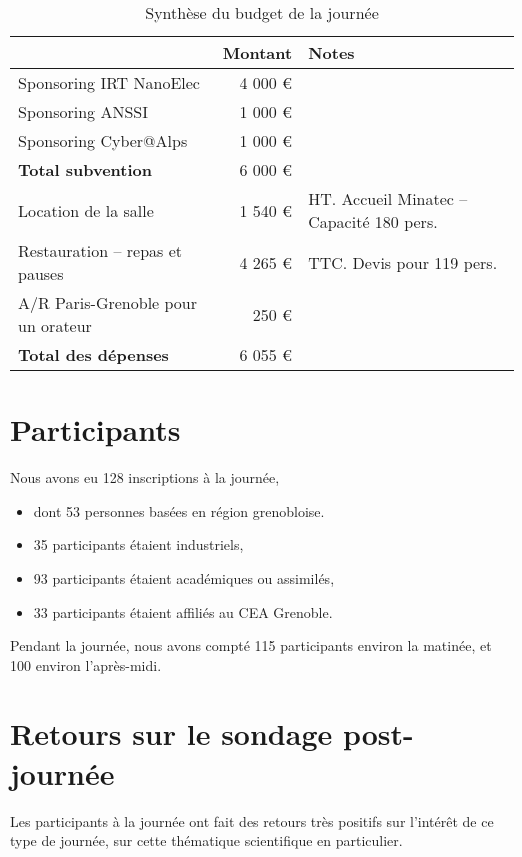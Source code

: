 \documentclass[a4paper,11pt]{article}
\begin{document}
\begin{table}[h]
\caption{\label{tab:org575d2de}
Synthèse du budget de la journée}
\centering
\begin{tabular}{lrl}
\hline
 & Montant & Notes\\
\hline
Sponsoring IRT NanoElec & 4 000 € & \\
Sponsoring ANSSI & 1 000 € & \\
Sponsoring Cyber@Alps & 1 000 € & \\
\hline
\textbf{Total subvention} & 6 000 € & \\
\hline
\hline
Location de la salle & 1 540 € & HT. Accueil Minatec – Capacité 180 pers.\\
Restauration – repas et pauses & 4 265 € & TTC. Devis pour 119 pers.\\
A/R Paris-Grenoble pour un orateur & 250 € & \\
\hline
\textbf{Total des dépenses} & 6 055 € & \\
\hline
\end{tabular}
\end{table}

\section{Participants}
\label{sec:org1a37b13}

Nous avons eu 128 inscriptions à la journée,

\begin{itemize}
\item dont 53 personnes basées en région grenobloise.
\item 35 participants étaient industriels,
\item 93 participants étaient académiques ou assimilés,
\item 33 participants étaient affiliés au CEA Grenoble.
\end{itemize}

Pendant la journée, nous avons compté 115 participants environ la
matinée, et 100 environ l'après-midi.

\section{Retours sur le sondage post-journée}
\label{sec:orgfe536b4}

Les participants à la journée ont fait des retours très positifs sur
l'intérêt de ce type de journée, sur cette thématique scientifique en
particulier.
\end{document}
